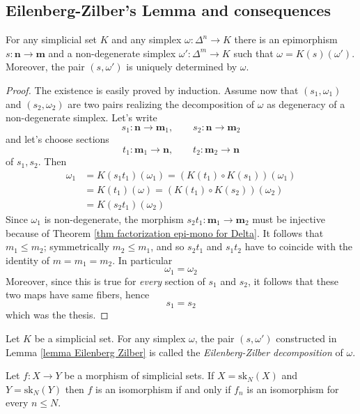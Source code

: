 \subsection{Eilenberg-Zilber's Lemma and consequences}

\begin{lemma} \label{lemma Eilenberg Zilber}
For any simplicial set $K$ and any simplex $\omega \colon \Delta^n \to K$ there is an epimorphism $s \colon \mathbf n \to \mathbf m$ and a non-degenerate simplex $\omega' \colon \Delta^m \to K$ such that $\omega = K(s)(\omega')$. Moreover, the pair $(s,\omega')$ is uniquely determined by $\omega$.
\end{lemma}

\begin{proof}
The existence is easily proved by induction. Assume now that $(s_1,\omega_1)$ and $(s_2,\omega_2)$ are two pairs realizing the decomposition of $\omega$ as degeneracy of a non-degenerate simplex. Let's write
\[
s_1 \colon \mathbf n \to \mathbf m_1, \qquad s_2 \colon \mathbf n \to \mathbf m_2
\]
and let's choose sections
\[
t_1 \colon \mathbf m_1 \to \mathbf n, \qquad t_2 \colon \mathbf m_2 \to \mathbf n
\]
of $s_1,s_2$. Then
\begin{align*}
\omega_1 & = K(s_1 t_1) (\omega_1) = (K(t_1) \circ K(s_1)) (\omega_1) \\
& = K(t_1)(\omega) = (K(t_1) \circ K(s_2))(\omega_2) \\
& = K(s_2 t_1)(\omega_2)
\end{align*}
Since $\omega_1$ is non-degenerate, the morphism $s_2 t_1 \colon \mathbf m_1 \to \mathbf m_2$ must be injective because of Theorem \ref{thm factorization epi-mono for Delta}. It follows that $m_1 \le m_2$; symmetrically $m_2 \le m_1$, and so $s_2 t_1$ and $s_1 t_2$ have to coincide with the identity of $m = m_1 = m_2$. In particular
\[
\omega_1 = \omega_2
\]
Moreover, since this is true for \emph{every} section of $s_1$ and $s_2$, it follows that these two maps have same fibers, hence
\[
s_1 = s_2
\]
which was the thesis.
\end{proof}

\begin{defin}
Let $K$ be a simplicial set. For any simplex $\omega$, the pair $(s,\omega')$ constructed in Lemma \ref{lemma Eilenberg Zilber} is called the \emph{Eilenberg-Zilber decomposition} of $\omega$.
\end{defin}

\begin{cor}
Let $f \colon X \to Y$ be a morphism of simplicial sets. If $X = \mathrm{sk}_N(X)$ and $Y = \mathrm{sk}_N(Y)$ then $f$ is an isomorphism if and only if $f_n$ is an isomorphism for every $n \le N$.
\end{cor}

